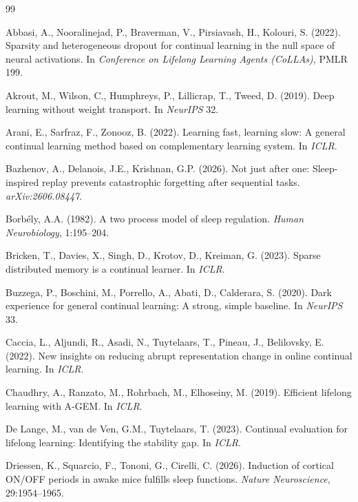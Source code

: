 \documentclass{article}
\begin{document}
\begin{thebibliography}{99}\small

 Abbasi, A., Nooralinejad, P., Braverman, V., Pirsiavash, H., Kolouri, S. (2022). Sparsity and heterogeneous dropout for continual learning in the null space of neural activations. In \emph{Conference on Lifelong Learning Agents (CoLLAs)}, PMLR 199.

 Akrout, M., Wilson, C., Humphreys, P., Lillicrap, T., Tweed, D. (2019). Deep learning without weight transport. In \emph{NeurIPS} 32.

 Arani, E., Sarfraz, F., Zonooz, B. (2022). Learning fast, learning slow: A general continual learning method based on complementary learning system. In \emph{ICLR}.

 Bazhenov, A., Delanois, J.E., Krishnan, G.P. (2026). Not just after one: Sleep-inspired replay prevents catastrophic forgetting after sequential tasks. \emph{arXiv:2606.08447}.

 Borb\'ely, A.A. (1982). A two process model of sleep regulation. \emph{Human Neurobiology}, 1:195--204.

 Bricken, T., Davies, X., Singh, D., Krotov, D., Kreiman, G. (2023). Sparse distributed memory is a continual learner. In \emph{ICLR}.

 Buzzega, P., Boschini, M., Porrello, A., Abati, D., Calderara, S. (2020). Dark experience for general continual learning: A strong, simple baseline. In \emph{NeurIPS} 33.

 Caccia, L., Aljundi, R., Asadi, N., Tuytelaars, T., Pineau, J., Belilovsky, E. (2022). New insights on reducing abrupt representation change in online continual learning. In \emph{ICLR}.

 Chaudhry, A., Ranzato, M., Rohrbach, M., Elhoseiny, M. (2019). Efficient lifelong learning with A-GEM. In \emph{ICLR}.

 De Lange, M., van de Ven, G.M., Tuytelaars, T. (2023). Continual evaluation for lifelong learning: Identifying the stability gap. In \emph{ICLR}.

 Driessen, K., Squarcio, F., Tononi, G., Cirelli, C. (2026). Induction of cortical ON/OFF periods in awake mice fulfills sleep functions. \emph{Nature Neuroscience}, 29:1954--1965.


\end{thebibliography}
\end{document}
